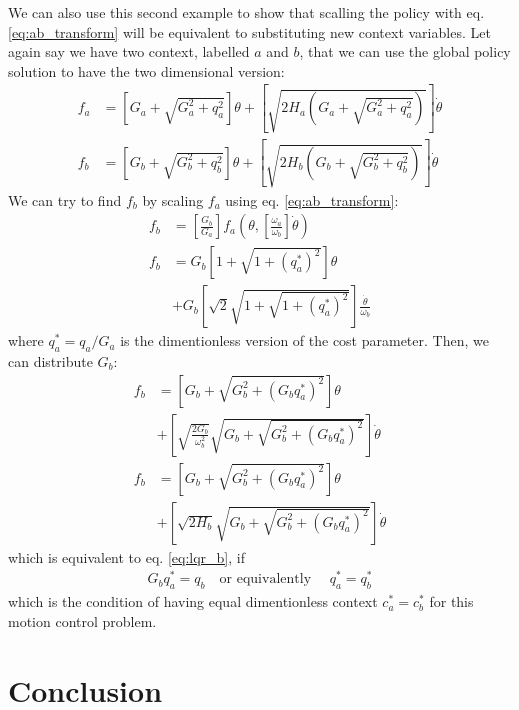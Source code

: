 We can also use this second example to show that scalling the policy with eq. \eqref{eq:ab_transform} will be equivalent to substituting new context variables. Let again say we have two context, labelled $a$ and $b$, that we can use the global policy solution to have the two dimensional version: 
\begin{align}
f_a &=
\left[ G_a + \sqrt{G_a^2+q_a^2}\right] \theta + \left[\sqrt{2H_a(G_a+\sqrt{G_a^2+q_a^2})}
\right] \dot{\theta} \\
f_b &=
\left[ G_b + \sqrt{G_b^2+q_b^2}\right] \theta + \left[\sqrt{2H_b(G_b+\sqrt{G_b^2+q_b^2})}
\right] \dot{\theta} \label{eq:lqr_b}
\end{align}
We can try to find $f_b$ by scaling $f_a$ using eq. \eqref{eq:ab_transform}:
\begin{align}
f_b &= \left[ \frac{G_b}{G_a} \right] f_a \left( \theta , \left[ \frac{\omega_a}{\omega_b} \right] \dot{\theta} \right) 
\\
f_b &= G_b \left[
1 + \sqrt{ 1 + (q_a^*)^2}
\right] \theta
\\ & + G_b
\left[
\sqrt{2} \sqrt{ 1 + \sqrt{ 1 + (q_a^*)^2}} \right] \frac{\dot{\theta}}{\omega_b} 
\end{align}
where $q_a^* = q_a / G_a$ is the dimentionless version of the cost parameter. Then, we can distribute $G_b$:
\begin{align}
f_b &= \left[
G_b + \sqrt{ G_b^2 + (G_b q_a^*)^2}
\right] \theta
\\ & +
\left[
\sqrt{\frac{2G_b}{\omega_b^2}} \sqrt{ G_b + \sqrt{ G_b^2 + (G_b q_a^*)^2}} \right] \dot{\theta}
\\
f_b &= \left[
G_b + \sqrt{ G_b^2 + (G_b q_a^*)^2}
\right] \theta
\\ & +
\left[
\sqrt{2 H_b} \sqrt{ G_b + \sqrt{ G_b^2 + (G_b q_a^*)^2}} \right] \dot{\theta}
\end{align}
which is equivalent to eq. \eqref{eq:lqr_b}, if 
\begin{align}
G_b q_a^* = q_b \quad \text{or equivalently } \quad q_a^* = q_b^*
\end{align}
which is the condition of having equal dimentionless context $c_a^* = c_b^*$ for this motion control problem.



\section{Conclusion}


